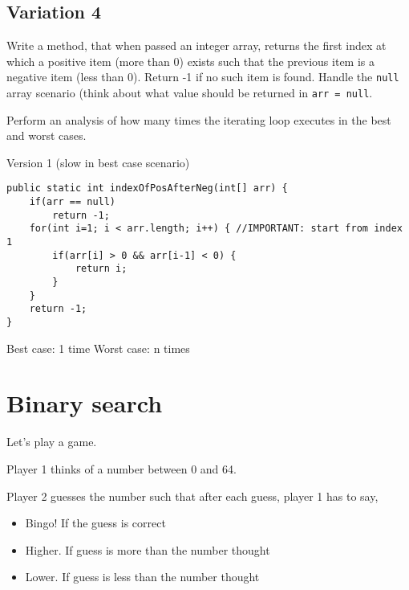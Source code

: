 \subsection{Variation 4}

\begin{exercise}
Write a method, that when passed an integer array, returns the first index at which a positive item (more than 0) exists such that the previous item is a negative item (less than 0). Return -1 if no such item is found. Handle the \texttt{null} array scenario (think about what value should be returned in \texttt{arr = null}.

Perform an analysis of how many times the iterating loop executes in the best and worst cases.
\end{exercise}
\begin{answer}
Version 1 (slow in best case scenario)
\begin{lstlisting}
public static int indexOfPosAfterNeg(int[] arr) {
	if(arr == null)
		return -1;
	for(int i=1; i < arr.length; i++) { //IMPORTANT: start from index 1
		if(arr[i] > 0 && arr[i-1] < 0) {
			return i;
		}
	}
	return -1;
}
\end{lstlisting}	
Best case: 1 time
Worst case: n times
\end{answer}

\section{Binary search}

Let's play a game.

Player 1 thinks of a number between 0 and 64. 
\vskip 1cm
\bgroup \tikzset{png export}  \egroup
\vskip 1cm

Player 2 guesses the number such that after each guess, player 1 has to say,

\begin{itemize}
\item Bingo! If the guess is correct
\item Higher. If guess is more than the number thought	
\item Lower. If guess is less than the number thought	
\end{itemize}

